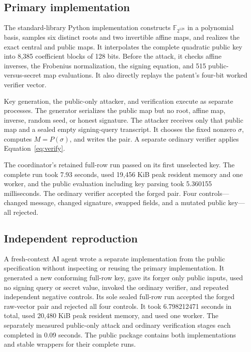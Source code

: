 \documentclass[10pt,a4paper]{article}
\newcommand{\F}{\mathbb F}
\begin{document}
\subsection{Primary implementation}

The standard-library Python implementation constructs $\F_{2^{128}}$ in a
polynomial basis, samples six distinct roots and two invertible affine maps,
and realizes the exact central and public maps.  It interpolates the complete
quadratic public key into 8,385 coefficient blocks of 128 bits.  Before the
attack, it checks affine inverses, the Frobenius normalization, the signing
equation, and 515 public-versus-secret map evaluations.  It also directly
replays the patent's four-bit worked verifier vector.

Key generation, the public-only attacker, and verification execute as
separate processes.  The generator serializes the public map but no root,
affine map, inverse, random seed, or honest signature.  The attacker receives
only that public map and a sealed empty signing-query transcript.  It chooses
the fixed nonzero $\sigma$, computes $M=P(\sigma)$, and writes the pair.  A
separate ordinary verifier applies Equation~\eqref{eq:verify}.

The coordinator's retained full-row run passed on its first unselected key.
The complete run took 7.93 seconds, used 19,456 KiB peak resident memory and
one worker, and the public evaluation including key parsing took 5.360155
milliseconds.  The ordinary verifier accepted the forged pair.  Four
controls---changed message, changed signature, swapped fields, and a mutated
public key---all rejected.

\subsection{Independent reproduction}

A fresh-context AI agent wrote a separate implementation from the public
specification without inspecting or reusing the primary implementation.  It
generated a new conforming full-row key, gave its forger only public inputs,
used no signing query or secret value, invoked the ordinary verifier, and
repeated independent negative controls.  Its sole sealed full-row run
accepted the forged raw-vector pair and rejected all four controls.  It took
6.798212471 seconds in total, used 20,480 KiB peak resident memory, and used
one worker.  The separately measured public-only attack and ordinary
verification stages each completed in 0.09 seconds.  The public package
contains both implementations and stable wrappers for their complete runs.
\end{document}
